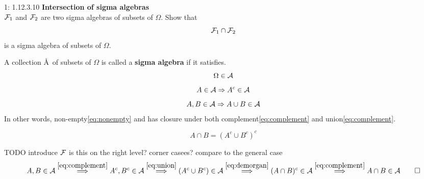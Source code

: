 \documentclass[a4paper,twoside=false,abstract=false,numbers=noenddot,
titlepage=false,headings=small,parskip=half,version=last]{scrartcl}
\begin{document}


\begin{exercise}{1: 1.12.3.10} {\bf Intersection of sigma algebras}   \\
    $\FF_1$ and $\FF_2$ are two sigma algebras of subsets of $\Omega$. Show
    that
    \begin{equation}
        \FF_1 \cap \FF_2
    \end{equation}
    is a sigma algebra of subsets of $\Omega$.
\end{exercise}
\begin{solution}
    \begin{definition}
        A collection \AA\, of subsets of $\Omega$ is called a \textbf{sigma
        algebra} if it satisfies.
        \begin{equation}
            \label{eq:nonempty}
            \Omega \in \AA
        \end{equation}
        \begin{equation}
            \label{eq:complement}
            A\in \AA \Rightarrow A^c \in \AA
        \end{equation}
        \begin{equation}
            \label{eq:union}
            A, B\in \AA \Rightarrow A\cup B \in \AA
        \end{equation}
        In other words, non-empty\eqref{eq:nonempty} and has closure under both
        complement\eqref{eq:complement} and union\eqref{eq:complement}.
    \end{definition}
    \begin{identity}
        \label{id:demorgan}
        \begin{equation}
            \label{eq:demorgan}
            A \cap B = (A^c \cup B^c)^c
        \end{equation}
    \end{identity}

    TODO introduce $\FF$ is this on the right level? corner casees? compare to
    the general case %
    \begin{equation}
        A, B \in \AA \stackrel{\eqref{eq:complement}}{\Longrightarrow}
        A^c, B^c \in \AA \stackrel{\eqref{eq:union}}{\Longrightarrow}
        (A^c \cup B^c) \in \AA \stackrel{\eqref{eq:demorgan}}{\Longrightarrow}
        (A \cap B)^c \in \AA \stackrel{\eqref{eq:complement}}{\Longrightarrow}
        A \cap B \in \AA \qed
    \end{equation}

%

\end{solution}
\pagebreak
\end{document}
